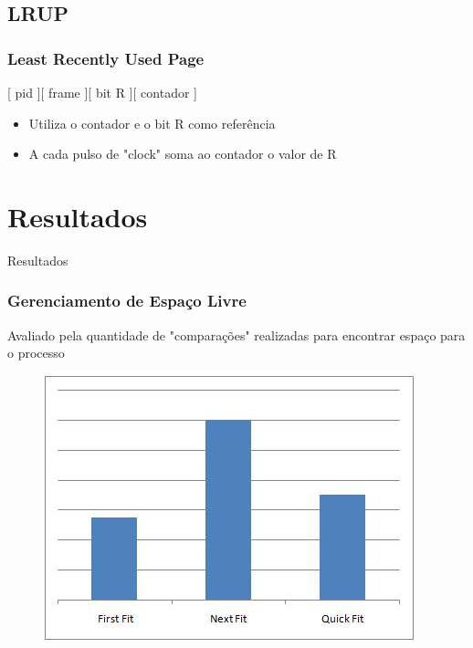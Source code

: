 \documentclass{beamer}
\begin{document}
\subsection{LRUP}
\begin{frame}
\frametitle{Least Recently Used Page}

\begin{center}
[ pid ][ frame ][ bit R ][ contador ]
\end{center}

\begin{itemize}
\item Utiliza o contador e o bit R como referência

\item A cada pulso de "clock" soma ao contador o valor de R
\end{itemize}
\justifying
\end{frame}

\section{Resultados} 
\begin{frame}
\begin{LARGE}
\begin{center}
Resultados
\end{center}
\end{LARGE}
\end{frame}

\begin{frame}
\frametitle{Gerenciamento de Espaço Livre} 
Avaliado pela quantidade de "comparações" realizadas para encontrar espaço para o processo

\begin{figure}
\centering
\includegraphics[scale=0.4]{graf.jpg}
\end{figure}

\justifying
\end{frame}
\end{document}
